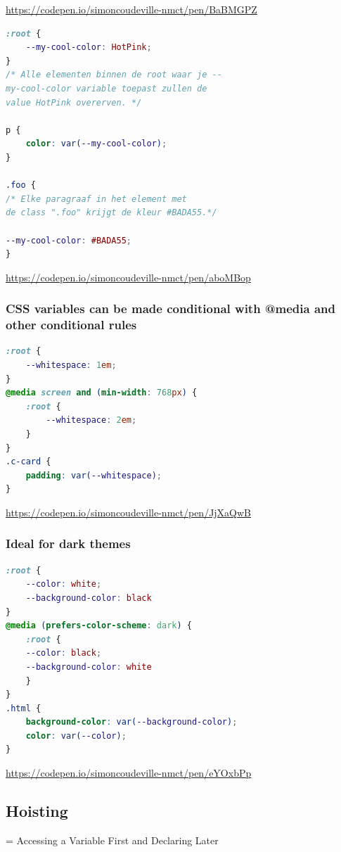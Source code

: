 \documentclass{article}
\begin{document}
\url{https://codepen.io/simoncoudeville-nmct/pen/BaBMGPZ}

\begin{lstlisting}[language=CSS]
:root {
    --my-cool-color: HotPink;
}
/* Alle elementen binnen de root waar je --
my-cool-color variable toepast zullen de
value HotPink overerven. */

p {
    color: var(--my-cool-color);
}

.foo {
/* Elke paragraaf in het element met
de class ".foo" krijgt de kleur #BADA55.*/

--my-cool-color: #BADA55;
}
\end{lstlisting}

\url{https://codepen.io/simoncoudeville-nmct/pen/aboMBop}

\subsubsection{CSS variables can be made conditional with @media and other conditional rules}

\begin{lstlisting}[language=CSS]
:root {
    --whitespace: 1em;
}
@media screen and (min-width: 768px) {
    :root {
        --whitespace: 2em;
    }
}
.c-card {
    padding: var(--whitespace);
}

\end{lstlisting}


\url{https://codepen.io/simoncoudeville-nmct/pen/JjXaQwB}

\subsubsection{Ideal for dark themes}

\begin{lstlisting}[language=CSS]
:root {
    --color: white;
    --background-color: black
}
@media (prefers-color-scheme: dark) {
    :root {
    --color: black;
    --background-color: white
    }
}
.html {
    background-color: var(--background-color);
    color: var(--color);
}
\end{lstlisting}

\url{https://codepen.io/simoncoudeville-nmct/pen/eYOxbPp}

\subsection{Hoisting}
= Accessing a Variable First and Declaring Later
\end{document}
